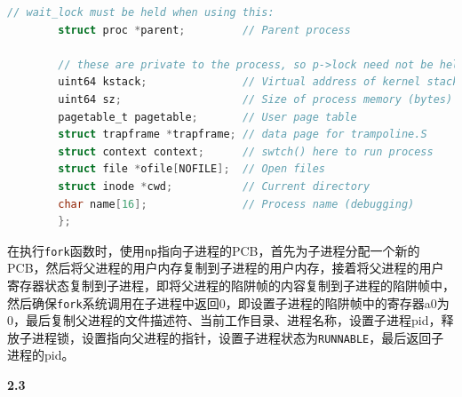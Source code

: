 \documentclass[UTF8]{article}
\newcommand{\tbf}[1]{\textbf{#1}}
\begin{document}
\begin{enumerate}[label=(\arabic*)]
\begin{lstlisting}[language=C]
        // wait_lock must be held when using this:
        struct proc *parent;         // Parent process

        // these are private to the process, so p->lock need not be held.
        uint64 kstack;               // Virtual address of kernel stack
        uint64 sz;                   // Size of process memory (bytes)
        pagetable_t pagetable;       // User page table
        struct trapframe *trapframe; // data page for trampoline.S
        struct context context;      // swtch() here to run process
        struct file *ofile[NOFILE];  // Open files
        struct inode *cwd;           // Current directory
        char name[16];               // Process name (debugging)
        };        
    \end{lstlisting}
\end{enumerate}

在执行\texttt{fork}函数时，使用\texttt{np}指向子进程的PCB，首先为子进程分配一个新的PCB，然后将父进程的用户内存复制到子进程的用户内存，接着将父进程的用户寄存器状态复制到子进程，即将父进程的陷阱帧的内容复制到子进程的陷阱帧中，然后确保\texttt{fork}系统调用在子进程中返回0，即设置子进程的陷阱帧中的寄存器a0为0，最后复制父进程的文件描述符、当前工作目录、进程名称，设置子进程pid，释放子进程锁，设置指向父进程的指针，设置子进程状态为\texttt{RUNNABLE}，最后返回子进程的pid。

\tbf{2.3}
\end{document}
